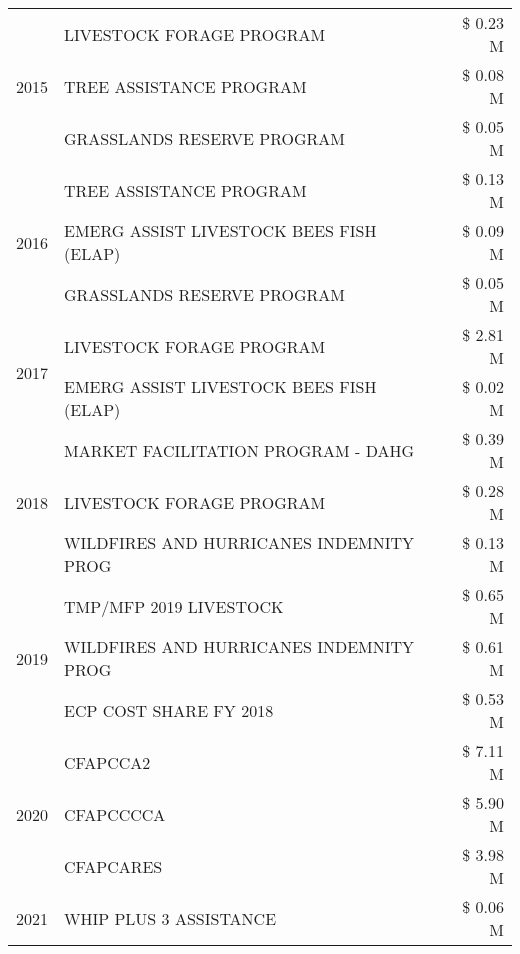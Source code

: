 \begin{tabular}{llr}
\cline{1-3}
\multirow[t]{3}{*}{2015} & LIVESTOCK FORAGE PROGRAM & \$ 0.23 M \\
 & TREE ASSISTANCE PROGRAM & \$ 0.08 M \\
 & GRASSLANDS RESERVE PROGRAM & \$ 0.05 M \\
\cline{1-3}
\multirow[t]{3}{*}{2016} & TREE ASSISTANCE PROGRAM                       & \$ 0.13 M \\
 & EMERG ASSIST LIVESTOCK BEES FISH (ELAP)       & \$ 0.09 M \\
 & GRASSLANDS RESERVE PROGRAM                    & \$ 0.05 M \\
\cline{1-3}
\multirow[t]{2}{*}{2017} & LIVESTOCK FORAGE PROGRAM & \$ 2.81 M \\
 & EMERG ASSIST LIVESTOCK BEES FISH (ELAP) & \$ 0.02 M \\
\cline{1-3}
\multirow[t]{3}{*}{2018} & MARKET FACILITATION PROGRAM - DAHG & \$ 0.39 M \\
 & LIVESTOCK FORAGE PROGRAM & \$ 0.28 M \\
 & WILDFIRES AND HURRICANES INDEMNITY PROG & \$ 0.13 M \\
\cline{1-3}
\multirow[t]{3}{*}{2019} & TMP/MFP 2019 LIVESTOCK & \$ 0.65 M \\
 & WILDFIRES AND HURRICANES INDEMNITY PROG & \$ 0.61 M \\
 & ECP COST SHARE FY 2018 & \$ 0.53 M \\
\cline{1-3}
\multirow[t]{3}{*}{2020} & CFAPCCA2 & \$ 7.11 M \\
 & CFAPCCCCA & \$ 5.90 M \\
 & CFAPCARES & \$ 3.98 M \\
\cline{1-3}
2021 & WHIP PLUS 3 ASSISTANCE & \$ 0.06 M \\
\cline{1-3}
\bottomrule
\end{tabular}
